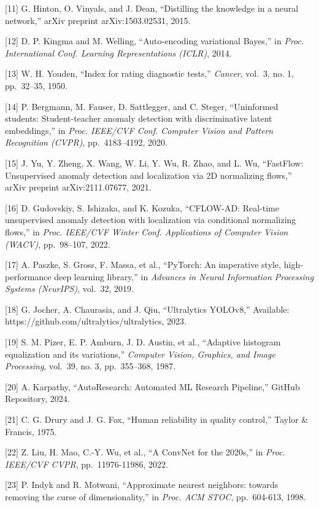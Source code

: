{[}11{]} G. Hinton, O. Vinyals, and J. Dean, ``Distilling the knowledge in a neural network,'' arXiv preprint arXiv:1503.02531, 2015.

{[}12{]} D. P. Kingma and M. Welling, ``Auto-encoding variational Bayes,'' in \emph{Proc. International Conf. Learning Representations (ICLR)}, 2014.

{[}13{]} W. H. Youden, ``Index for rating diagnostic tests,'' \emph{Cancer}, vol.~3, no. 1, pp.~32--35, 1950.

{[}14{]} P. Bergmann, M. Fauser, D. Sattlegger, and C. Steger, ``Uninformed students: Student-teacher anomaly detection with discriminative latent embeddings,'' in \emph{Proc. IEEE/CVF Conf. Computer Vision and Pattern Recognition (CVPR)}, pp.~4183--4192, 2020.

{[}15{]} J. Yu, Y. Zheng, X. Wang, W. Li, Y. Wu, R. Zhao, and L. Wu, ``FastFlow: Unsupervised anomaly detection and localization via 2D normalizing flows,'' arXiv preprint arXiv:2111.07677, 2021.

{[}16{]} D. Gudovskiy, S. Ishizaka, and K. Kozuka, ``CFLOW-AD: Real-time unsupervised anomaly detection with localization via conditional normalizing flows,'' in \emph{Proc. IEEE/CVF Winter Conf. Applications of Computer Vision (WACV)}, pp.~98--107, 2022.

{[}17{]} A. Paszke, S. Gross, F. Massa, et al., ``PyTorch: An imperative style, high-performance deep learning library,'' in \emph{Advances in Neural Information Processing Systems (NeurIPS)}, vol.~32, 2019.

{[}18{]} G. Jocher, A. Chaurasia, and J. Qiu, ``Ultralytics YOLOv8,'' Available: https://github.com/ultralytics/ultralytics, 2023.

{[}19{]} S. M. Pizer, E. P. Amburn, J. D. Austin, et al., ``Adaptive histogram equalization and its variations,'' \emph{Computer Vision, Graphics, and Image Processing}, vol.~39, no. 3, pp.~355--368, 1987.

{[}20{]} A. Karpathy, ``AutoResearch: Automated ML Research Pipeline,'' GitHub Repository, 2024.

{[}21{]} C. G. Drury and J. G. Fox, ``Human reliability in quality control,'' Taylor \& Francis, 1975.

{[}22{]} Z. Liu, H. Mao, C.-Y. Wu, et al., ``A ConvNet for the 2020s,'' in \emph{Proc. IEEE/CVF CVPR}, pp.~11976-11986, 2022.

{[}23{]} P. Indyk and R. Motwani, ``Approximate nearest neighbors: towards removing the curse of dimensionality,'' in \emph{Proc. ACM STOC}, pp.~604-613, 1998.

